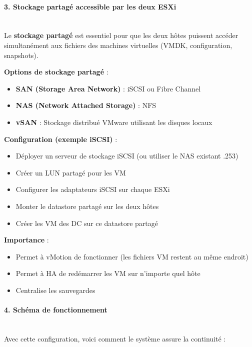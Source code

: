 \paragraph{3. Stockage partagé accessible par les deux ESXi}

\noindent \vspace{0.5cm} \\ Le \textbf{stockage partagé} est essentiel pour que les deux hôtes puissent accéder simultanément aux fichiers des machines virtuelles (VMDK, configuration, snapshots).

\noindent \textbf{Options de stockage partagé} :
\begin{itemize}
	\item \textbf{SAN (Storage Area Network)} : iSCSI ou Fibre Channel
	\item \textbf{NAS (Network Attached Storage)} : NFS
	\item \textbf{vSAN} : Stockage distribué VMware utilisant les disques locaux
\end{itemize}

\noindent \textbf{Configuration (exemple iSCSI)} :
\begin{itemize}
	\item Déployer un serveur de stockage iSCSI (ou utiliser le NAS existant .253)
	\item Créer un LUN partagé pour les VM
	\item Configurer les adaptateurs iSCSI sur chaque ESXi
	\item Monter le datastore partagé sur les deux hôtes
	\item Créer les VM des DC sur ce datastore partagé
\end{itemize}

\noindent \textbf{Importance} :
\begin{itemize}
	\item Permet à vMotion de fonctionner (les fichiers VM restent au même endroit)
	\item Permet à HA de redémarrer les VM sur n'importe quel hôte
	\item Centralise les sauvegardes
\end{itemize}

\paragraph{4. Schéma de fonctionnement}

\noindent \vspace{0.5cm} \\ Avec cette configuration, voici comment le système assure la continuité :

